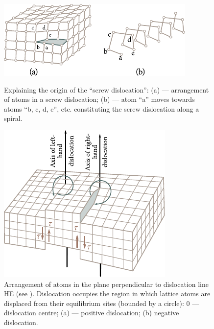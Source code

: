 \begin{figure}[t]
	\begin{minipage}[t]{0.5\linewidth}
		\begin{center}
			\includegraphics[scale=0.9]{figures/ch_02/fig_2_12.pdf}
			\caption[]{Explaining the origin of the ``screw dislocation'': (a) --- arrangement of atoms in a screw dislocation; (b) --- atom ``a'' moves towards atoms ``b, c, d, e'', etc. constituting the screw dislocation along a spiral.}
			\label{fig:2_12}
		\end{center}
	\end{minipage}
	\hfill{ }%
	\begin{minipage}[t]{0.46\linewidth}
		\begin{center}
			\includegraphics[scale=0.9]{figures/ch_02/fig_2_13.pdf}
			\caption[]{Arrangement of atoms in the plane perpendicular to dislocation line HE (see ). Dislocation occupies the region in which lattice atoms are displaced from their equilibrium sites (bounded by a circle): $0$ --- dislocation centre; (a) --- positive dislocation; (b) negative dislocation.}
			\label{fig:2_13}
		\end{center}
	\end{minipage}
\vspace{-0.3cm}
\end{figure}

